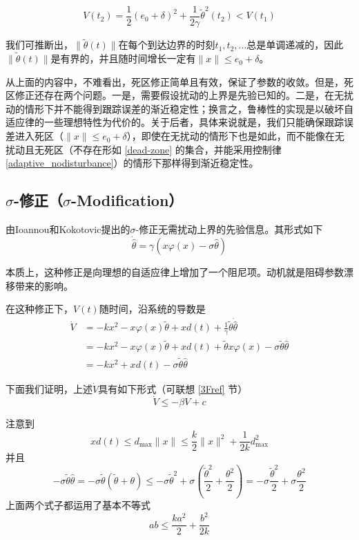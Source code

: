 \[V(t_{2}) = \frac{1}{2}(e_{0} + \delta)^{2} + \frac{1}{2\gamma}{\tilde{\theta}}^{2}(t_{2}) < V(t_{1})\]

我们可推断出，\(\| \tilde{\theta}(t) \|\)在每个到达边界的时刻\(t_{1},t_{2},\ldots\)总是单调递减的，因此\(\| \tilde{\theta}(t) \|\)是有界的，并且随时间增长一定有\(\| x \| \leq e_{0} + \delta\)。

从上面的内容中，不难看出，死区修正简单且有效，保证了参数的收敛。但是，死区修正还存在两个问题。一是，需要假设扰动的上界是先验已知的。二是，在无扰动的情形下并不能得到跟踪误差的渐近稳定性；换言之，鲁棒性的实现是以破坏自适应律的一些理想特性为代价的。关于后者，具体来说就是，我们只能确保跟踪误差进入死区（$\| x \| \leq e_0 + \delta$），即使在无扰动的情形下也是如此，而不能像在无扰动且无死区（不存在形如 \eqref{dead-zone} 的集合，并能采用控制律 \eqref{adaptive_nodisturbance}）的情形下那样得到渐近稳定性。

\subsection{\texorpdfstring{$\sigma$-修正（$\sigma$-Modification）}{σ-修正（σ-Modification）}}
由Ioannou和Kokotovic提出的$\sigma$-修正无需扰动上界的先验信息。其形式如下
\begin{equation} \label{sigma_modification}
    \dot{\hat{\theta}} = \gamma(x\varphi(x) - \sigma\hat{\theta})
\end{equation}

本质上，这种修正是向理想的自适应律上增加了一个阻尼项。动机就是阻碍参数漂移带来的影响。

在这种修正下，\(V(t)\)随时间，沿系统的导数是
\[\begin{aligned}
\dot{V} & = - kx^{2} - x\varphi(x)\tilde{\theta} + xd(t) + \frac{1}{\gamma}\tilde{\theta}\dot{\hat{\theta}} \\
 & = - kx^{2} - x\varphi(x)\tilde{\theta} + xd(t) + \tilde{\theta}x\varphi(x) - \sigma\tilde{\theta}\hat{\theta} \\
 & = - kx^{2} + xd(t) - \sigma\tilde{\theta}\hat{\theta} 
\end{aligned}\]

下面我们证明，上述$\dot{V}$具有如下形式（可联想 \ref{3Fref} 节）
\[\dot{V} \le - \beta V + c\]

注意到\begin{equation}
    xd(t) \leq d_{\max} \| x \| \leq \frac{k}{2}\| x \|^{2} + \frac{1}{2k}d_{\max}^{2}\label{temp_neq1}
\end{equation}
并且\begin{equation}
    - \sigma\tilde{\theta}\hat{\theta} = - \sigma\tilde{\theta}(\tilde{\theta} + \theta)
    \leq - \sigma{\tilde{\theta}}^{2} + \sigma\left(\frac{{\tilde{\theta}}^{2}}{2} + \frac{\theta^{2}}{2}\right)
    = - \sigma\frac{{\tilde{\theta}}^{2}}{2} + \sigma\frac{\theta^{2}}{2}\label{temp_neq2}
\end{equation}
上面两个式子都运用了基本不等式\[ab \leq \frac{ka^{2}}{2} + \frac{b^{2}}{2k}\]


